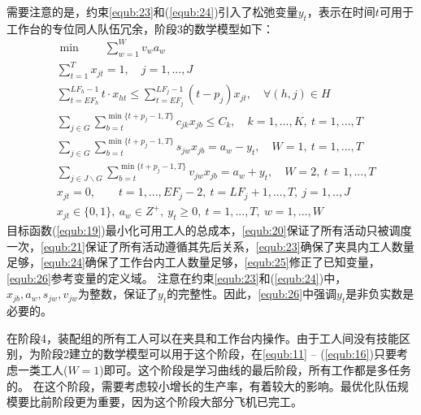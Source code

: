 需要注意的是，约束\eqref{equb:23}和(\ref{equb:24})引入了松弛变量$y_t$，表示在时间$t$可用于工作台的专位同人队伍冗余，阶段3的数学模型如下：
\begin{align}
&\label{equb:19} \min \qquad \sum_{w=1}^{W}v_wa_w\\
&\label{equb:20} \sum_{t = 1}^T x_{jt}  = 1,\quad j = 1,...,J\\
&\label{equb:21} \sum_{t = EF_h}^{LF_h -1}t\cdot x_{ht}\leqslant \sum_{t = EF_j}^{LF_j - 1}(t - p_j)x_{jt},\quad \forall (h,j) \in H\\
&\label{equb:22} \sum_{j\in G}\sum_{b=t}^{\min\{t + p_j-1,T\}}c_{jk}x_{jb}\leqslant C_k,\quad k = 1,...,K,\ t = 1,...,T\\
&\label{equb:23} \sum_{j\in G}\sum_{b=t}^{\min\{t + p_j-1,T\}}s_{jw}x_{jb} = a_w - y_t,\quad W = 1,\ t = 1,...,T\\
&\label{equb:24} \sum_{j\in J\backslash G}\sum_{b=t}^{\min\{t + p_j-1,T\}}v_{jw}x_{jb} = a_w + y_t,\quad W = 2,\ t = 1,...,T\\
&\label{equb:25} x_{jt} = 0,\qquad t = 1,...,EF_j - 2,\ t = LF_j +1 ,...,T,\ j =1,..,J\\
&\label{equb:26} x_{jt}\in \{0,1\},\ a_w \in Z^+,\ y_t \geqslant 0,\ t = 1,...,T,\ w = 1,...,W
\end{align}
目标函数(\ref{equb:19})最小化可用工人的总成本，\eqref{equb:20}保证了所有活动只被调度一次，\eqref{equb:21}保证了所有活动遵循其先后关系，\eqref{equb:23}确保了夹具内工人数量足够，\eqref{equb:24}确保了工作台内工人数量足够，\eqref{equb:25}修正了已知变量，\eqref{equb:26}参考变量的定义域。
注意在约束\eqref{equb:23}和(\ref{equb:24})中，$x_{jb},a_w,s_{jw},v_{jw}$为整数，保证了$y_t$的完整性。因此，\eqref{equb:26}中强调$y_t$是非负实数是必要的。

在阶段4，装配组的所有工人可以在夹具和工作台内操作。由于工人间没有技能区别，为阶段2建立的数学模型可以用于这个阶段，在\eqref{equb:11} -- (\ref{equb:16})只要考虑一类工人($W = 1$)即可。这个阶段是学习曲线的最后阶段，所有工作都是多任务的。
在这个阶段，需要考虑较小增长的生产率，有着较大的影响。最优化队伍规模要比前阶段更为重要，因为这个阶段大部分飞机已完工。